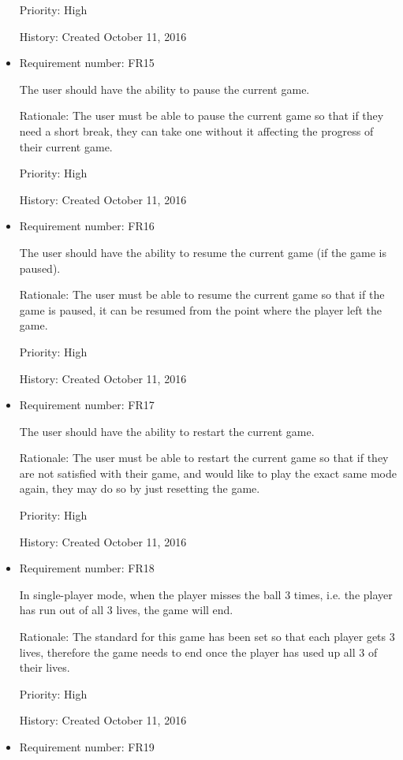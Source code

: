 \documentclass[12pt,letterpaper]{article}
\begin{document}
\begin{itemize}
		Priority: High

		History: Created October 11, 2016

		\item Requirement number: FR15

		The user should have the ability to pause the current game.

		Rationale: The user must be able to pause the current game so that if they need a short break, they can take one without it affecting the progress of their current game.

		Priority: High

		History: Created October 11, 2016

		\item Requirement number: FR16

		The user should have the ability to resume the current game (if the game is paused).

		Rationale: The user must be able to resume the current game so that if the game is paused, it can be resumed from the point where the player left the game.

		Priority: High
	
		History: Created October 11, 2016

		\item Requirement number: FR17

		The user should have the ability to restart the current game.

		Rationale: The user must be able to restart the current game so that if they are not satisfied with their game, and would like to play the exact same mode again, they may do so by just resetting the game.

		Priority: High

		History: Created October 11, 2016

		\item Requirement number: FR18

		In single-player mode, when the player misses the ball 3 times, i.e. the player has run out of all 3 lives, the game will end.

		Rationale: The standard for this game has been set so that each player gets 3 lives, therefore the game needs to end once the player has used up all 3 of their lives.

		Priority: High

		History: Created October 11, 2016

		\item Requirement number: FR19


\end{itemize}
\end{document}
